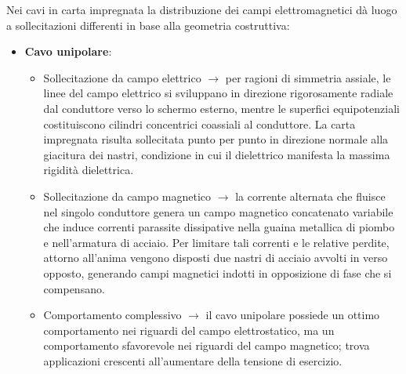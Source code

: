 Nei cavi in carta impregnata la distribuzione dei campi elettromagnetici dà luogo a sollecitazioni differenti in base alla geometria costruttiva:
\begin{itemize}
    \item \textbf{Cavo unipolare}:
    \begin{itemize}
        \item Sollecitazione da campo elettrico $\rightarrow$ per ragioni di simmetria assiale, le linee del campo elettrico si sviluppano in direzione rigorosamente radiale dal conduttore verso lo schermo esterno, mentre le superfici equipotenziali costituiscono cilindri concentrici coassiali al conduttore. La carta impregnata risulta sollecitata punto per punto in direzione normale alla giacitura dei nastri, condizione in cui il dielettrico manifesta la massima rigidità dielettrica.
        \item Sollecitazione da campo magnetico $\rightarrow$ la corrente alternata che fluisce nel singolo conduttore genera un campo magnetico concatenato variabile che induce correnti parassite dissipative nella guaina metallica di piombo e nell'armatura di acciaio. Per limitare tali correnti e le relative perdite, attorno all'anima vengono disposti due nastri di acciaio avvolti in verso opposto, generando campi magnetici indotti in opposizione di fase che si compensano.
        \item Comportamento complessivo $\rightarrow$ il cavo unipolare possiede un ottimo comportamento nei riguardi del campo elettrostatico, ma un comportamento sfavorevole nei riguardi del campo magnetico; trova applicazioni crescenti all'aumentare della tensione di esercizio.
    \end{itemize}
    

\end{itemize}
